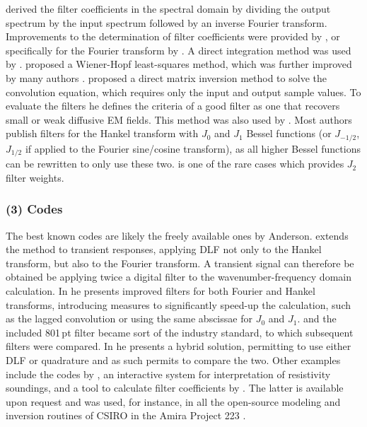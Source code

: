 \documentclass[paper,twocolumn,twoside]{geophysics}
\begin{document}
\cite{PhD.70.Ghosh} derived the filter coefficients in the spectral domain by
dividing the output spectrum by the input spectrum followed by an inverse
Fourier transform. Improvements to the determination of filter coefficients
were provided by \cite{EXG.75.ONeill, GEO.77.Nyman, GEO.82.Das}, or
specifically for the Fourier transform by \cite{GP.86.Nissen}. A direct
integration method was used by \cite{GP.76.Bichara, GP.78.Bernabini}.
\cite{GP.79.Koefoed} proposed a Wiener-Hopf least-squares method, which was
further improved by many authors \citep{GP.82.Guptasarma, GEO.1982.Murakami,
GP.97.Guptasarma}. \cite{GP.07.Kong} proposed a direct matrix inversion method
to solve the convolution equation, which requires only the input and output
sample values. To evaluate the filters he defines the criteria of a good filter
as one that recovers small or weak diffusive EM fields. This method was also
used by \cite{GEO.09.Key, GEO.12.Key}. Most authors publish filters for the
Hankel transform with $J_0$ and $J_1$ Bessel functions (or $J_{-1/2}$,
$J_{1/2}$ if applied to the Fourier sine/cosine transform), as all higher
Bessel functions can be rewritten to only use these two. \cite{GP.94.Mohsen} is
one of the rare cases which provides $J_2$ filter weights.

\subsubsection{(3) Codes}

The best known codes are likely the freely available ones by Anderson.
\cite{USGS.73.Anderson} extends the method to transient responses, applying DLF
not only to the Hankel transform, but also to the Fourier transform. A
transient signal can therefore be obtained be applying twice a digital filter
to the wavenumber-frequency domain calculation. In \cite{USGS.75.Anderson,
GEO.79.Anderson} he presents improved filters for both Fourier and Hankel
transforms, introducing measures to significantly speed-up the calculation,
such as the lagged convolution or using the same abscissae for $J_0$ and $J_1$.
\cite{TMS.82.Anderson} and the included 801\,pt filter became sort of the
industry standard, to which subsequent filters were compared. In
\cite{GEO.89.Anderson} he presents a hybrid solution, permitting to use either
DLF or quadrature and as such permits to compare the two. Other examples
include the codes by \cite{GP.75.Johansen}, an interactive system for
interpretation of resistivity soundings, and a tool to calculate filter
coefficients by \cite{GP.90.Christensen}. The latter is available upon request
and was used, for instance, in all the open-source modeling and inversion
routines of CSIRO in the Amira Project 223 \citep{ASEG.07.Raiche}. \newline
\end{document}
